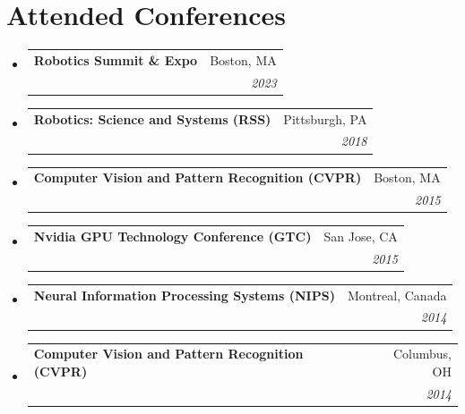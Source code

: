 \documentclass[letterpaper,11pt]{article}
\makeatletter
\newcommand{\resumeSubheading}[4]{
  \vspace{-1pt}\item
    \begin{tabular*}{0.97\textwidth}[t]{l@{\extracolsep{\fill}}r}
      \textbf{#1} & #2 \\
      \textit{\small#3} & \textit{\small #4} \\
    \end{tabular*}\vspace{-5pt}
}
\newcommand{\resumeSubHeadingListStart}{\begin{itemize}[leftmargin=*]}
\newcommand{\resumeSubHeadingListEnd}{\end{itemize}}
\makeatother
\begin{document}
\section{Attended Conferences}
  \resumeSubHeadingListStart
    \resumeSubheading
      {Robotics Summit \& Expo}{Boston, MA}{}{2023}
    \resumeSubheading
      {Robotics: Science and Systems (RSS)}{Pittsburgh, PA}{}{2018}
    \resumeSubheading
      {Computer Vision and Pattern Recognition (CVPR)}{Boston, MA}{}{2015}
    \resumeSubheading
      {Nvidia GPU Technology Conference (GTC)}{San Jose, CA}{}{2015}
    \resumeSubheading
      {Neural Information Processing Systems (NIPS)}{Montreal, Canada}{}{2014}
    \resumeSubheading
      {Computer Vision and Pattern Recognition (CVPR)}{Columbus, OH}{}{2014}
  \resumeSubHeadingListEnd

\end{document}
